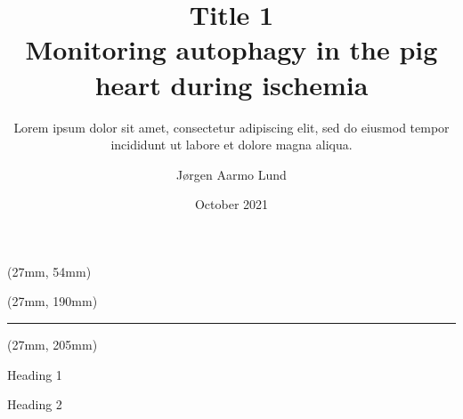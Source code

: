 \documentclass{beamer}
\title{Title 1 \\ Monitoring autophagy in the pig heart during ischemia}
\subtitle{Lorem ipsum dolor sit amet, consectetur adipiscing elit, sed do eiusmod tempor incididunt ut labore et dolore magna aliqua.}
\author{Jørgen Aarmo Lund}
\institute{Machine Learning Group, UiT The Arctic University of Norway}
\date{October 2021}
\begin{document}
\begin{frame}
    \begin{textblock*}{787mm}(27mm, 54mm)
        \maketitle
    \end{textblock*}
    \begin{textblock*}{787mm}(27mm, 190mm)
        \rule{\textwidth}{1pt}
    \end{textblock*}
    
    \begin{textblock*}{257mm}(27mm, 205mm)
        \begin{minipage}[t][880mm][t]{\textwidth}
            
            \begin{block}{Heading 1}
                \lipsum[1-2]
            \end{block}
            \begin{block}{Heading 2}
                \lipsum[3-4]
            \end{block}
                    
        \end{minipage}
    \end{textblock*}
    

\end{frame}
\end{document}

